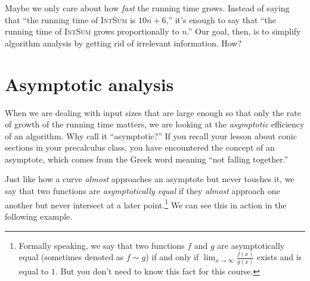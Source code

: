 Maybe we only care about how \textit{fast} the running time grows. Instead of saying that ``the running time of \textsc{IntSum} is $10n+6$,'' it's enough to say that ``the running time of \textsc{IntSum} grows proportionally to $n$.'' Our goal, then, is to simplify algorithm analysis by getting rid of irrelevant information. How?

\section{Asymptotic analysis}
\label{sec:asymptotic}

When we are dealing with input sizes that are large enough so that only the rate of growth of the running time matters, we are looking at the \textit{asymptotic} efficiency of an algorithm. Why call it ``asymptotic?'' If you recall your lesson about conic sections in your precalculus class, you have encountered the concept of an asymptote, which comes from the Greek word meaning ``not falling together.'' 

Just like how a curve \textit{almost} approaches an asymptote but never touches it, we say that two functions are \textit{asymptotically equal} if they \textit{almost} approach one another but never intersect at a later point.\footnote{Formally speaking, we say that two functions $f$ and $g$ are asymptotically equal (sometimes denoted as $f \sim g$) if and only if $\lim_{x \to \infty}{\frac{f\left(x\right)}{g\left(x\right)}}$ exists and is equal to $1$. But you don't need to know this fact for this course.} We can see this in action in the following example.

